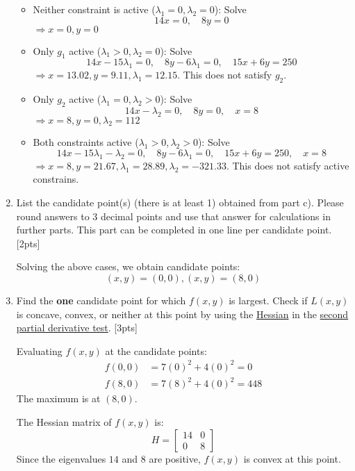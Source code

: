\documentclass{article}
\begin{document}
\begin{enumerate}[label=(\alph*)]
\begin{itemize}
    \item Neither constraint is active ($\lambda_1 = 0, \lambda_2 = 0$): Solve \[ 14x = 0, \quad 8y = 0 \] \( \Rightarrow x = 0, y = 0 \)
    \item Only $g_1$ active ($\lambda_1 > 0, \lambda_2 = 0$): Solve \[ 14x - 15\lambda_1 = 0, \quad 8y - 6\lambda_1 = 0, \quad 15x + 6y = 250 \] \( \Rightarrow x = 13.02, y = 9.11, \lambda_1 = 12.15 \). This does not satisfy $g_2$.
    \item Only $g_2$ active ($\lambda_1 = 0, \lambda_2 > 0$): Solve \[ 14x - \lambda_2 = 0, \quad 8y = 0, \quad x = 8 \] \( \Rightarrow x = 8, y = 0, \lambda_2 = 112 \)
    \item Both constraints active ($\lambda_1 > 0, \lambda_2 > 0$): Solve \[ 14x - 15\lambda_1 - \lambda_2 = 0, \quad 8y - 6\lambda_1 = 0, \quad 15x + 6y = 250, \quad x = 8 \] \( \Rightarrow x = 8, y = 21.67, \lambda_1 = 28.89, \lambda_2 = -321.33.\) This does not satisfy active constrains.
\end{itemize}

    \item List the candidate point(s) (there is at least 1) obtained from part c). Please round answers to 3 decimal points and use that answer for calculations in further parts. This part can be completed in one line per candidate point. [2pts]

    Solving the above cases, we obtain candidate points:
\[ (x, y) = (0, 0), (x, y) = (8, 0) \]

    \item Find the \textbf{one} candidate point for which $f(x,y)$ is largest. Check if $L(x,y)$ is concave, convex, or neither at this point by using the \href{https://www.khanacademy.org/math/multivariable-calculus/applications-of-multivariable-derivatives/quadratic-approximations/a/the-hessian}{Hessian} in the \href{https://www.khanacademy.org/math/multivariable-calculus/applications-of-multivariable-derivatives/optimizing-multivariable-functions/a/second-partial-derivative-test}{second partial derivative test}.  [3pts]

    Evaluating $f(x, y)$ at the candidate points:
\begin{align*}
    f(0, 0) &= 7(0)^2 + 4(0)^2 = 0 \\
    f(8, 0) &= 7(8)^2 + 4(0)^2 = 448
\end{align*}
The maximum is at $(8, 0)$. 

The Hessian matrix of $f(x, y)$ is:
\[ H = \begin{bmatrix} 14 & 0 \\ 0 & 8 \end{bmatrix} \]
Since the eigenvalues $14$ and $8$ are positive, $f(x,y)$ is convex at this point.

\end{enumerate}
\end{document}
